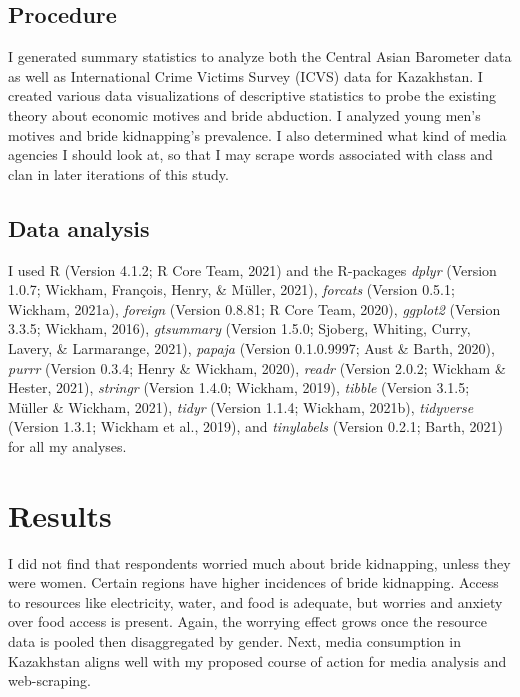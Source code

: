 \documentclass[
  english,
  man]{apa6}
\begin{document}
\hypertarget{procedure}{%
\subsection{Procedure}\label{procedure}}

I generated summary statistics to analyze both the Central Asian Barometer data as well as International Crime Victims Survey (ICVS) data for Kazakhstan. I created various data visualizations of descriptive statistics to probe the existing theory about economic motives and bride abduction. I analyzed young men's motives and bride kidnapping's prevalence. I also determined what kind of media agencies I should look at, so that I may scrape words associated with class and clan in later iterations of this study.

\hypertarget{data-analysis}{%
\subsection{Data analysis}\label{data-analysis}}

I used R (Version 4.1.2; R Core Team, 2021) and the R-packages \emph{dplyr} (Version 1.0.7; Wickham, François, Henry, \& Müller, 2021), \emph{forcats} (Version 0.5.1; Wickham, 2021a), \emph{foreign} (Version 0.8.81; R Core Team, 2020), \emph{ggplot2} (Version 3.3.5; Wickham, 2016), \emph{gtsummary} (Version 1.5.0; Sjoberg, Whiting, Curry, Lavery, \& Larmarange, 2021), \emph{papaja} (Version 0.1.0.9997; Aust \& Barth, 2020), \emph{purrr} (Version 0.3.4; Henry \& Wickham, 2020), \emph{readr} (Version 2.0.2; Wickham \& Hester, 2021), \emph{stringr} (Version 1.4.0; Wickham, 2019), \emph{tibble} (Version 3.1.5; Müller \& Wickham, 2021), \emph{tidyr} (Version 1.1.4; Wickham, 2021b), \emph{tidyverse} (Version 1.3.1; Wickham et al., 2019), and \emph{tinylabels} (Version 0.2.1; Barth, 2021) for all my analyses.

\hypertarget{results}{%
\section{Results}\label{results}}

I did not find that respondents worried much about bride kidnapping, unless they were women. Certain regions have higher incidences of bride kidnapping. Access to resources like electricity, water, and food is adequate, but worries and anxiety over food access is present. Again, the worrying effect grows once the resource data is pooled then disaggregated by gender. Next, media consumption in Kazakhstan aligns well with my proposed course of action for media analysis and web-scraping.
\end{document}
